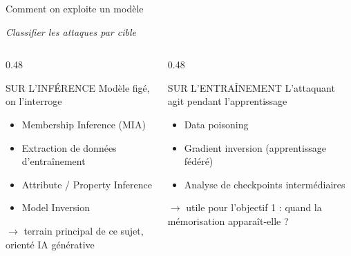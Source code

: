 \documentclass[aspectratio=169, 10pt, table]{beamer}
\newcommand{\subtitleline}[1]{{\small\itshape\color{TSPcyan}#1\par}\vspace{0.2cm}}
\begin{document}
\begin{frame}{Comment on exploite un modèle}
    \subtitleline{Classifier les attaques par cible}
    
    \begin{columns}[T]
        \begin{column}{0.48\textwidth}
            \begin{block}{SUR L'INFÉRENCE}
                Modèle figé, on l'interroge
                \begin{itemize}
                    \item Membership Inference (MIA)
                    \item Extraction de données d'entraînement
                    \item Attribute / Property Inference
                    \item Model Inversion
                \end{itemize}
                \vspace{0.2cm}
                $\rightarrow$ terrain principal de ce sujet, orienté IA générative
            \end{block}
        \end{column}
        \begin{column}{0.48\textwidth}
            \begin{block}{SUR L'ENTRAÎNEMENT}
                L'attaquant agit pendant l'apprentissage
                \begin{itemize}
                    \item Data poisoning
                    \item Gradient inversion (apprentissage fédéré)
                    \item Analyse de checkpoints intermédiaires
                \end{itemize}
                \vspace{0.2cm}
                $\rightarrow$ utile pour l'objectif 1 : quand la mémorisation apparaît-elle ?
            \end{block}
        \end{column}
    \end{columns}
\end{frame}
\end{document}
